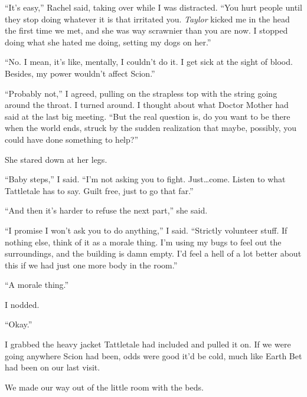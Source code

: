 ``It's easy,'' Rachel said, taking over while I was distracted.  ``You hurt people until they stop doing whatever it is that irritated you.  \emph{Taylor }kicked me in the head the first time we met, and she was way scrawnier than you are now.  I stopped doing what she hated me doing, setting my dogs on her.''



``No.  I mean, it's like, mentally, I couldn't do it.  I get sick at the sight of blood.  Besides, my power wouldn't affect Scion.''



``Probably not,'' I agreed, pulling on the strapless top with the string going around the throat.  I turned around.  I thought about what Doctor Mother had said at the last big meeting.  ``But the real question is, do you want to be there when the world ends, struck by the sudden realization that maybe, possibly, you could have done something to help?''



She stared down at her legs.



``Baby steps,'' I said.  ``I'm not asking you to fight.  Just\ldots come.  Listen to what Tattletale has to say.  Guilt free, just to go that far.''



``And then it's harder to refuse the next part,'' she said.



``I promise I won't ask you to do anything,'' I said.  ``Strictly volunteer stuff.  If nothing else, think of it as a morale thing.  I'm using my bugs to feel out the surroundings, and the building is damn empty.  I'd feel a hell of a lot better about this if we had just one more body in the room.''



``A morale thing.''



I nodded.



``Okay.''



I grabbed the heavy jacket Tattletale had included and pulled it on.  If we were going anywhere Scion had been, odds were good it'd be cold, much like Earth Bet had been on our last visit.



We made our way out of the little room with the beds.



